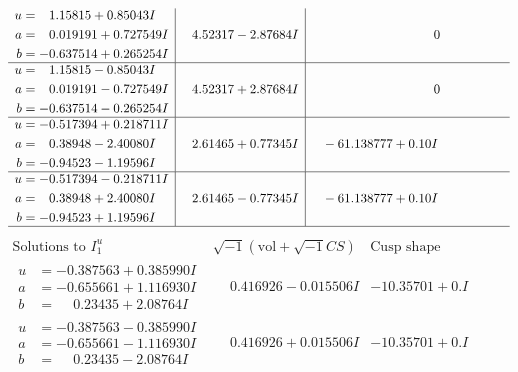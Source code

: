 \documentclass[1p]{elsarticle_modified}
\theoremstyle{definition}
\newcommand{\I}{\sqrt{-1}}
\begin{document}
$$\begin{array}{c|c|c}
\begin{aligned}
u &= \phantom{-}1.15815 + 0.85043 I \\
a &= \phantom{-}0.019191 + 0.727549 I \\
b &= -0.637514 + 0.265254 I\end{aligned}
 & \phantom{-}4.52317 - 2.87684 I & \phantom{-0.000000 } 0 \\ \hline\begin{aligned}
u &= \phantom{-}1.15815 - 0.85043 I \\
a &= \phantom{-}0.019191 - 0.727549 I \\
b &= -0.637514 - 0.265254 I\end{aligned}
 & \phantom{-}4.52317 + 2.87684 I & \phantom{-0.000000 } 0 \\ \hline\begin{aligned}
u &= -0.517394 + 0.218711 I \\
a &= \phantom{-}0.38948 - 2.40080 I \\
b &= -0.94523 - 1.19596 I\end{aligned}
 & \phantom{-}2.61465 + 0.77345 I & \phantom{-}                -6
1.138777 + 0. 10   I\phantom{ +0.000000I} \\ \hline\begin{aligned}
u &= -0.517394 - 0.218711 I \\
a &= \phantom{-}0.38948 + 2.40080 I \\
b &= -0.94523 + 1.19596 I\end{aligned}
 & \phantom{-}2.61465 - 0.77345 I & \phantom{-}                -6
1.138777 + 0. 10   I\phantom{ +0.000000I}\\
 \hline 
 \end{array}$$\newpage$$\begin{array}{c|c|c}  
\text{Solutions to }I^u_{1}& \I (\text{vol} + \sqrt{-1}CS) & \text{Cusp shape}\\
 \hline 
\begin{aligned}
u &= -0.387563 + 0.385990 I \\
a &= -0.655661 + 1.116930 I \\
b &= \phantom{-}0.23435 + 2.08764 I\end{aligned}
 & \phantom{-}0.416926 - 0.015506 I & -10.35701 + 0. I\phantom{ +0.000000I} \\ \hline\begin{aligned}
u &= -0.387563 - 0.385990 I \\
a &= -0.655661 - 1.116930 I \\
b &= \phantom{-}0.23435 - 2.08764 I\end{aligned}
 & \phantom{-}0.416926 + 0.015506 I & -10.35701 + 0. I\phantom{ +0.000000I} \\ \hline\begin{aligned}

\end{aligned}
\end{array}$$
\end{document}
